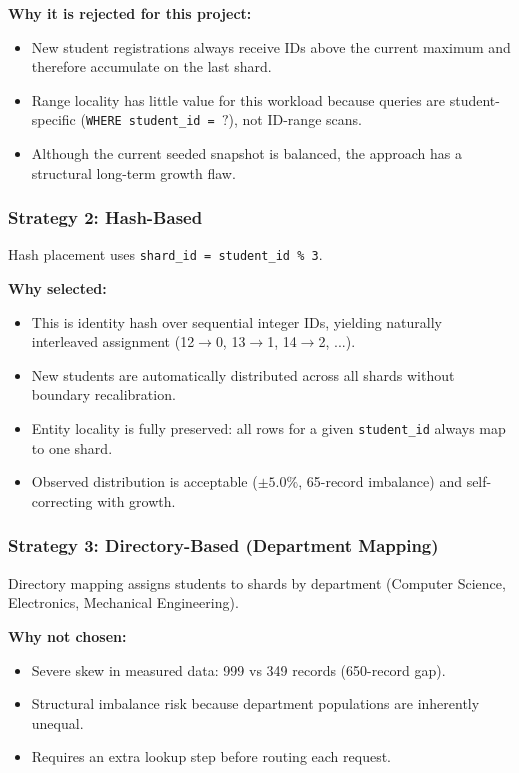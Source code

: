 \documentclass[conference]{IEEEtran}
\begin{document}
\textbf{Why it is rejected for this project:}
\begin{itemize}
    \item New student registrations always receive IDs above the current maximum and therefore accumulate on the last shard.
    \item Range locality has little value for this workload because queries are student-specific (\texttt{WHERE student\_id = }$?$), not ID-range scans.
    \item Although the current seeded snapshot is balanced, the approach has a structural long-term growth flaw.
\end{itemize}

\subsubsection{Strategy 2: Hash-Based}
Hash placement uses \texttt{shard\_id = student\_id \% 3}.

\textbf{Why selected:}
\begin{itemize}
    \item This is identity hash over sequential integer IDs, yielding naturally interleaved assignment (12$\rightarrow$0, 13$\rightarrow$1, 14$\rightarrow$2, ...).
    \item New students are automatically distributed across all shards without boundary recalibration.
    \item Entity locality is fully preserved: all rows for a given \texttt{student\_id} always map to one shard.
    \item Observed distribution is acceptable ($\pm 5.0\%$, 65-record imbalance) and self-correcting with growth.
\end{itemize}

\subsubsection{Strategy 3: Directory-Based (Department Mapping)}
Directory mapping assigns students to shards by department (Computer Science, Electronics, Mechanical Engineering).

\textbf{Why not chosen:}
\begin{itemize}
    \item Severe skew in measured data: 999 vs 349 records (650-record gap).
    \item Structural imbalance risk because department populations are inherently unequal.
    \item Requires an extra lookup step before routing each request.
\end{itemize}
\end{document}
